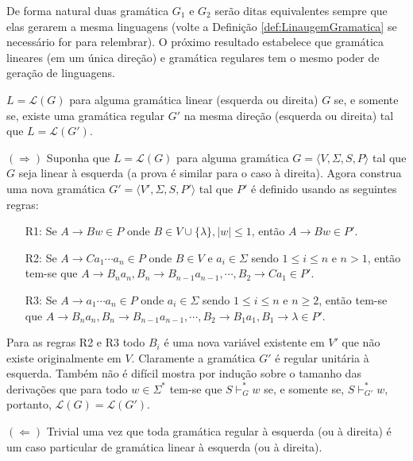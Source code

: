 De forma natural duas gramática $G_1$ e $G_2$ serão ditas equivalentes sempre que elas gerarem a mesma linguagens (volte a Definição \ref{def:LinaugemGramatica} se necessário for para relembrar). O próximo resultado estabelece que gramática lineares (em um única direção) e gramática regulares tem o mesmo poder de geração de linguagens.

\begin{teorema}\label{teo:SimplificacaoRegular}
	$L = \mathcal{L}(G)$ para alguma gramática linear (esquerda ou direita)  $G$ se, e somente se, existe uma gramática regular $G'$ na mesma direção (esquerda ou direita) tal que $L = \mathcal{L}(G')$.
\end{teorema}

\begin{prova}
  $(\Rightarrow)$ Suponha que $L = \mathcal{L}(G)$ para alguma gramática $G = \langle V, \Sigma, S, P \rangle$ tal que $G$ seja linear à esquerda (a prova é similar para o caso à direita). Agora construa uma nova gramática $G' = \langle V', \Sigma, S, P' \rangle$ tal que $P'$ é definido usando as seguintes regras: 
		
	\begin{itemize}
		\item[R1:] Se $A \rightarrow Bw \in P$ onde $B \in V \cup \{\lambda\},  |w| \leq 1$, então $A \rightarrow Bw \in P'$.
		\item[R2:] Se $A \rightarrow Ca_1\cdots a_n \in P$ onde $B \in V$ e $a_i \in \Sigma$ sendo $1 \leq i \leq n$ e $n > 1$, então tem-se que $A \rightarrow B_na_n, B_n \rightarrow B_{n-1}a_{n-1}, \cdots, B_2 \rightarrow Ca_1 \in P'$.
		\item[R3:] Se $A \rightarrow a_1\cdots a_n \in P$ onde $a_i \in \Sigma$ sendo $1 \leq i \leq n$ e $n \geq 2$, então tem-se que $A \rightarrow B_na_n, B_n \rightarrow B_{n-1}a_{n-1}, \cdots, B_2 \rightarrow B_1a_1, B_1 \rightarrow \lambda \in P'$.
	\end{itemize}

	Para as regras R2 e R3 todo $B_i$ é uma nova variável existente em $V'$ que não existe originalmente em $V$. Claramente a gramática $G'$ é regular unitária à esquerda. Também não é difícil mostra por indução sobre o tamanho das derivações que para todo $w \in \Sigma^*$ tem-se que $S \vdash^*_G w$ se, e somente se, $S \vdash^*_{G'} w$, portanto, $\mathcal{L}(G) = \mathcal{L}(G')$.
	
	$(\Leftarrow)$ Trivial uma vez que toda gramática regular à esquerda (ou à direita) é um caso particular de gramática linear à esquerda (ou à direita).
\end{prova}
